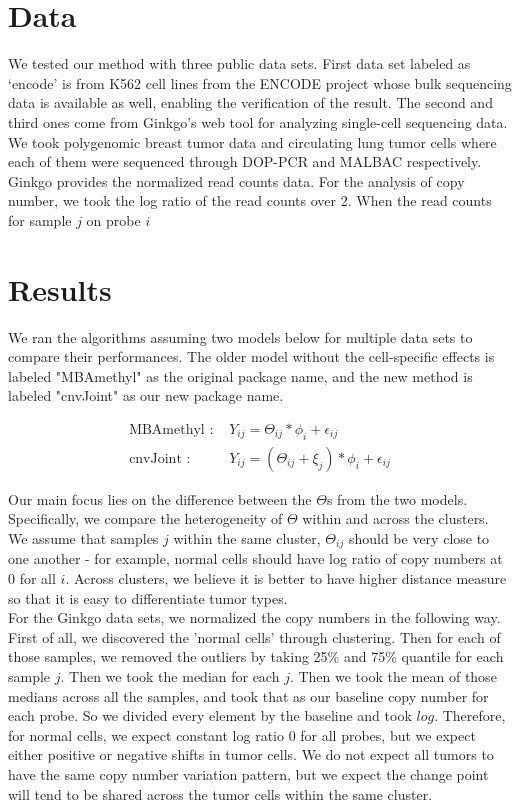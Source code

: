 \documentclass[11pt]{article}
\begin{document}
\section{Data}
We tested our method with three public data sets. First data set labeled as `encode' is from K562 cell lines from the ENCODE project whose bulk sequencing data is available as well, enabling the verification of the result. The second and third ones come from Ginkgo's web tool for analyzing single-cell sequencing data. We took polygenomic breast tumor data and circulating lung tumor cells where each of them were sequenced through DOP-PCR and MALBAC respectively. \\

\noindent Ginkgo provides the normalized read counts data. For the analysis of copy number, we took the log ratio of the read counts over 2. When the read counts for sample $j$ on probe $i$ 

\section{Results}
\noindent We ran the algorithms assuming two models below for multiple data sets to compare their performances. The older model without the cell-specific effects is labeled "MBAmethyl" as the original package name, and the new method is labeled "cnvJoint" as our new package name. 

\begin{align*}
\text{MBAmethyl : }&Y_{ij} = \Theta_{ij} * \phi_i + \epsilon_{ij}\\
\text{cnvJoint : }&Y_{ij} = (\Theta_{ij} + \xi_j)*\phi_i + \epsilon_{ij}
\end{align*}

\noindent Our main focus lies on the difference between the $\Theta$s from the two models. Specifically, we compare the heterogeneity of $\Theta$ within and across the clusters. We assume that samples $j$ within the same cluster, $\Theta_{ij}$ should be very close to one another - for example, normal cells should have log ratio of copy numbers at 0 for all $i$. Across clusters, we believe it is better to have higher distance measure so that it is easy to differentiate tumor types. \\


\noindent For the Ginkgo data sets, we normalized the copy numbers in the following way. First of all, we discovered the 'normal cells' through clustering. Then for each of those samples, we removed the outliers by taking 25\% and 75\% quantile for each sample $j$. Then we took the median for each $j$. Then we took the mean of those medians across all the samples, and took that as our baseline copy number for each probe. So we divided every element by the baseline and took $log$. Therefore, for normal cells, we expect constant log ratio 0 for all probes, but we expect either positive or negative shifts in tumor cells. We do not expect all tumors to have the same copy number variation pattern, but we expect the change point will tend to be shared across the tumor cells within the same cluster.\\
\end{document}
